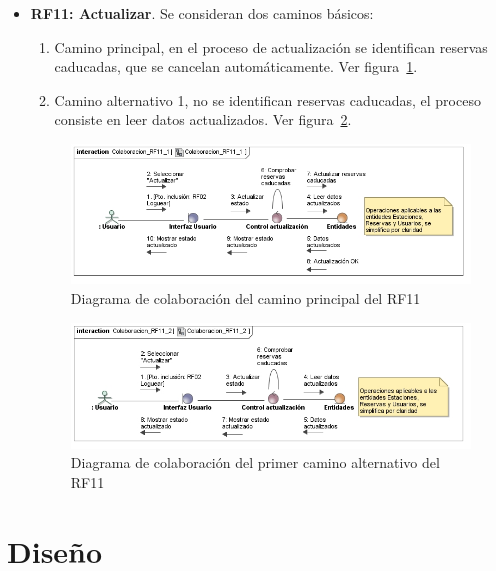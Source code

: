 \begin{itemize}
	\FloatBarrier
	\item \textbf{RF11: Actualizar}. Se consideran dos caminos básicos: 
	\begin{enumerate}
		\item Camino principal, en el proceso de actualización se identifican reservas caducadas, que se cancelan automáticamente. Ver figura~\ref{fig:diagramaColaboracion_RF11_1}.
		\item Camino alternativo 1, no se identifican reservas caducadas, el proceso consiste en leer datos actualizados. Ver figura~\ref{fig:diagramaColaboracion_RF11_2}.
	\end{enumerate}
	\begin{figure} [!htb]
		\centering
		\includegraphics[width=\linewidth,height=\textheight,keepaspectratio]{Images/Diagramas/04_Colaboracion_RF11_1}
		\caption{Diagrama de colaboración del camino principal del RF11}
		\label{fig:diagramaColaboracion_RF11_1}
	\end{figure}
	\begin{figure} [!htb]
		\centering
		\includegraphics[width=\linewidth,height=\textheight,keepaspectratio]{Images/Diagramas/04_Colaboracion_RF11_2}
		\caption{Diagrama de colaboración del primer camino alternativo del RF11}
		\label{fig:diagramaColaboracion_RF11_2}
	\end{figure}
		
\end{itemize}



\section{Diseño}


